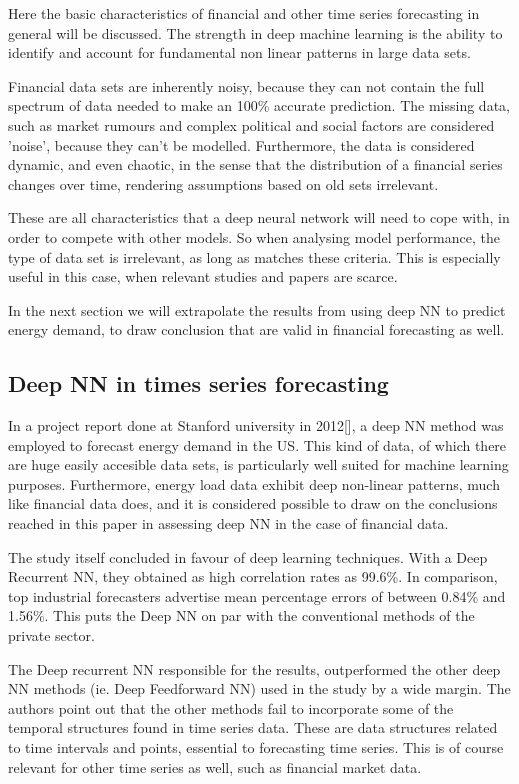 Here the basic characteristics of financial and other time series forecasting in general will be discussed.
The strength in deep machine learning is the ability to identify and account for fundamental non linear patterns in large data sets.

Financial data sets are inherently noisy, because they can not contain the full spectrum of data needed to make an 100\% accurate prediction. The missing data, such as market rumours and complex political and social factors are considered 'noise', because they can't be modelled. Furthermore, the data is considered dynamic, and even chaotic, in the sense that the distribution of a financial series changes over time, rendering assumptions based on old sets irrelevant. 

These are all characteristics that a deep neural network will need to cope with, in order to compete with other models. So when analysing model performance, the type of data set is irrelevant, as long as matches these criteria. This is especially useful in this case, when relevant studies and papers are scarce.

In the next section we will extrapolate the results from using deep NN to predict energy demand, to draw conclusion that are valid in financial forecasting as well.

\subsection{Deep NN in times series forecasting}

In a project report done at Stanford university in 2012[], a deep NN method was employed to forecast energy demand in the US. This kind of data, of which there are huge easily accesible data sets, is particularly well suited for machine learning purposes. Furthermore, energy load data exhibit deep non-linear patterns, much like financial data does, and it is considered possible to draw on the conclusions reached in this paper in assessing deep NN in the case of financial data.

The study itself concluded in favour of deep learning techniques. With a Deep Recurrent NN, they obtained as high correlation rates as 99.6\%. In comparison, top industrial forecasters advertise mean percentage errors of between 0.84\% and 1.56\%. This puts the Deep NN on par with the conventional methods of the private sector.

The Deep recurrent NN responsible for the results, outperformed the other deep NN methods (ie. Deep Feedforward NN) used in the study by a wide margin. The authors point out that the other methods fail to incorporate some of the temporal structures found in time series data. These are data structures related to time intervals and points, essential to forecasting time series. This is of course relevant for other time series as well, such as financial market data.

